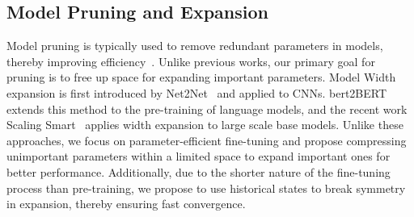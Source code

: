 \subsection{Model Pruning and Expansion}
Model pruning is typically used to remove redundant parameters in models, thereby improving efficiency~\citep{kurtic-etal-2022-optimal,ma2023llmpruner}. Unlike previous works, our primary goal for pruning is to free up space for expanding important parameters.
Model Width expansion is first introduced by Net2Net~\citep{DBLP:journals/corr/ChenGS15} and applied to CNNs. bert2BERT~\citep{chen-etal-2022-bert2bert} extends this method to the pre-training of language models, and the recent work Scaling Smart~\citep{DBLP:journals/corr/abs-2409-12903} applies width expansion to large scale base models. Unlike these approaches, we focus on parameter-efficient fine-tuning and propose compressing unimportant parameters within a limited space to expand important ones for better performance. Additionally, due to the shorter nature of the fine-tuning process than pre-training, we propose to use historical states to break symmetry in expansion, thereby ensuring fast convergence.